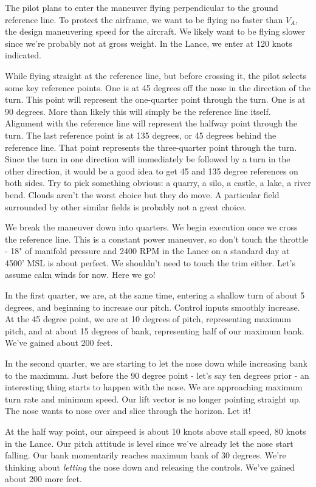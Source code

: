 The pilot plans to enter the maneuver flying perpendicular to the ground reference line. To protect the airframe, we want to be flying no faster than $V_A$, the design maneuvering speed for the aircraft. We likely want to be flying slower since we're probably not at gross weight. In the Lance, we enter at 120 knots indicated.

While flying straight at the reference line, but before crossing it, the pilot selects some key reference points. One is at 45 degrees off the nose in the direction of the turn. This point will represent the one-quarter point through the turn. One is at 90 degrees. More than likely this will simply be the reference line itself. Alignment with the reference line will represent the halfway point through the turn. The last reference point is at 135 degrees, or 45 degrees behind the reference line. That point represents the three-quarter point through the turn. Since the turn in one direction will immediately be followed by a turn in the other direction, it would be a good idea to get 45 and 135 degree references on both sides. Try to pick something obvious: a quarry, a silo, a castle, a lake, a river bend. Clouds aren't the worst choice but they do move. A particular field surrounded by other similar fields is probably not a great choice.

We break the maneuver down into quarters. We begin execution once we cross the reference line. This is a constant power maneuver, so don't touch the throttle - 18" of manifold pressure and 2400 RPM in the Lance on a standard day at 4500' MSL is about perfect. We shouldn't need to touch the trim either. Let's assume calm winds for now. Here we go!

In the first quarter, we are, at the same time, entering a shallow turn of about 5 degrees, and beginning to increase our pitch. Control inputs smoothly increase. At the 45 degree point, we are at 10 degrees of pitch, representing maximum pitch, and at about 15 degrees of bank, representing half of our maximum bank. We've gained about 200 feet.

In the second quarter, we are starting to let the nose down while increasing bank to the maximum. Just before the 90 degree point - let's say ten degrees prior - an interesting thing starts to happen with the nose. We are approaching maximum turn rate and minimum speed. Our lift vector is no longer pointing straight up. The nose wants to nose over and slice through the horizon. Let it!

At the half way point, our airspeed is about 10 knots above stall speed, 80 knots in the Lance. Our pitch attitude is level since we've already let the nose start falling. Our bank momentarily reaches maximum bank of 30 degrees. We're thinking about \emph{letting} the nose down and releasing the controls. We've gained about 200 more feet.

